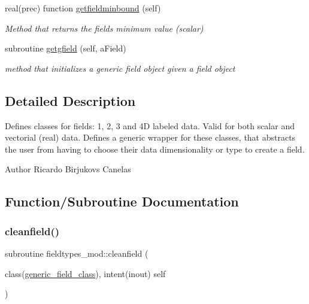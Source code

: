 \begin{DoxyCompactItemize}
real(prec) function \mbox{\hyperlink{namespacefieldtypes__mod_aec092e7c0b82a7b3a828ae18af80b810}{getfieldminbound}} (self)
\begin{DoxyCompactList}\small\item\em Method that returns the field\textquotesingle{}s minimum value (scalar) \end{DoxyCompactList}\item 
subroutine \mbox{\hyperlink{namespacefieldtypes__mod_a214565d2002baff775a030611630fc32}{getgfield}} (self, a\+Field)
\begin{DoxyCompactList}\small\item\em method that initializes a generic field object given a field object \end{DoxyCompactList}\end{DoxyCompactItemize}


\subsection{Detailed Description}
Defines classes for \textquotesingle{}fields\textquotesingle{}\+: 1, 2, 3 and 4D labeled data. Valid for both scalar and vectorial (real) data. Defines a generic wrapper for these classes, that abstracts the user from having to choose their data dimensionality or type to create a field. 

\begin{DoxyAuthor}{Author}
Ricardo Birjukovs Canelas 
\end{DoxyAuthor}


\subsection{Function/\+Subroutine Documentation}
\mbox{\label{namespacefieldtypes__mod_a1d491079d69fb297c4fedd4f37d85e8e}} 
\subsubsection{\texorpdfstring{cleanfield()}{cleanfield()}}
{\footnotesize\ttfamily subroutine fieldtypes\+\_\+mod\+::cleanfield (\begin{DoxyParamCaption}\item[{class(\mbox{\hyperlink{structfieldtypes__mod_1_1generic__field__class}{generic\+\_\+field\+\_\+class}}), intent(inout)}]{self }\end{DoxyParamCaption})\hspace{0.3cm}{\ttfamily [private]}}



